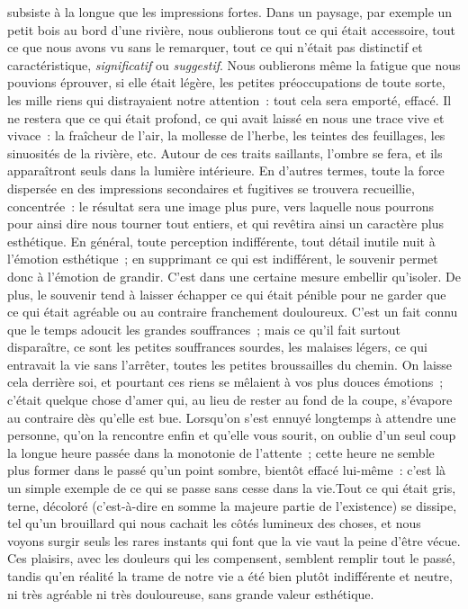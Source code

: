 \documentclass[french,twoside]{book} %
\begin{document}
subsiste à la longue que les impressions fortes. Dans un paysage, par exemple un petit bois au bord d’une rivière, nous oublierons tout ce qui était accessoire, tout ce que nous avons vu sans le remarquer, tout ce qui n’était pas distinctif et caractéristique, \emph{significatif} ou \emph{suggestif}. Nous oublierons même la fatigue que nous pouvions éprouver, si elle était légère, les petites préoccupations de toute sorte, les mille riens qui distrayaient notre attention : tout cela sera emporté, effacé. Il ne restera que ce qui était profond, ce qui avait laissé en nous une trace vive et vivace : la fraîcheur de l’air, la mollesse de l’herbe, les teintes des feuillages, les sinuosités de la rivière, etc. Autour de ces traits saillants, l’ombre se fera, et ils apparaîtront seuls dans la lumière intérieure. En d’autres termes, toute la force dispersée en des impressions secondaires et fugitives se trouvera recueillie, concentrée : le résultat sera une image plus pure, vers laquelle nous pourrons pour ainsi dire nous tourner tout entiers, et qui revêtira ainsi un caractère plus esthétique. En général, toute perception indifférente, tout détail inutile nuit à l’émotion esthétique ; en supprimant ce qui est indifférent, le souvenir permet donc à l’émotion de grandir. C’est dans une certaine mesure embellir qu’isoler. De plus, le souvenir tend à laisser échapper ce qui était pénible pour ne garder que ce qui était agréable ou au contraire franchement douloureux. C’est un fait connu que le temps adoucit les grandes souffrances ; mais ce qu’il fait surtout disparaître, ce sont les petites souffrances sourdes, les malaises légers, ce qui entravait la vie sans l’arrêter, toutes les petites broussailles du chemin. On laisse cela derrière soi, et pourtant ces riens se mêlaient à vos plus douces émotions ; c’était quelque chose d’amer qui, au lieu de rester au fond de la coupe, s’évapore au contraire dès qu’elle est bue. Lorsqu’on s’est ennuyé longtemps à attendre une personne, qu’on la rencontre enfin et qu’elle vous sourit, on oublie d’un seul coup la longue heure passée dans la monotonie de l’attente ; cette heure ne semble plus former dans le passé qu’un point sombre, bientôt effacé lui-même : c’est là un simple exemple de ce qui se passe sans cesse dans la vie.Tout ce qui était gris, terne, décoloré (c’est-à-dire en somme la majeure partie de l’existence) se dissipe, tel qu’un brouillard qui nous cachait les côtés lumineux des choses, et nous voyons surgir seuls les rares instants qui font que la vie vaut la peine d’être vécue. Ces plaisirs, avec les douleurs qui les compensent, semblent remplir tout le passé, tandis qu’en réalité la trame de notre vie a été bien plutôt indifférente et neutre, ni très agréable ni très douloureuse, sans grande valeur esthétique.\par
\end{document}
